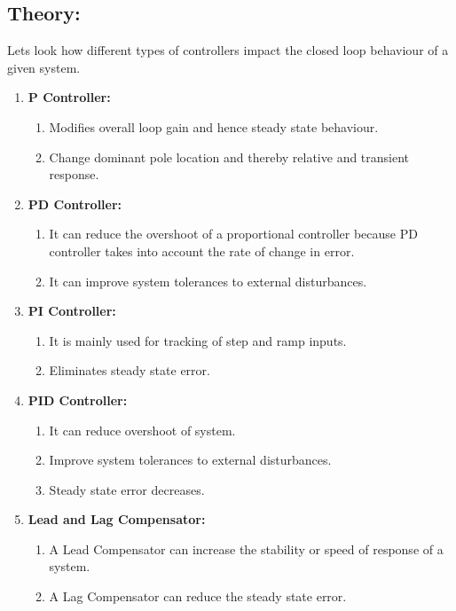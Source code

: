 \documentclass[12pt]{article}
\begin{document}
\subsection*{Theory:}
Lets look how different types of controllers impact the closed loop behaviour of a given system.
\begin{enumerate}[label={\alph*)}]
  \item \textbf{P Controller:}
  \begin{enumerate}[label={(\roman*)}]
    \item Modifies overall loop gain and hence steady state behaviour.
    
    \item Change dominant pole location and thereby relative and transient response.
  \end{enumerate}

  \item \textbf{PD Controller:}
  \begin{enumerate}[label={(\roman*)}]
    \item It can reduce the overshoot of a proportional controller because PD controller takes into account the rate of change in error.
    
    \item It can improve system tolerances to external disturbances.
  \end{enumerate}

  \item \textbf{PI Controller:}
  \begin{enumerate}[label={(\roman*)}]
    \item It is mainly used for tracking of step and ramp inputs.
    \item Eliminates steady state error.
  \end{enumerate}


  \item \textbf{PID Controller:}
  \begin{enumerate}[label={(\roman*)}]
    \item It can reduce overshoot of system.
    \item Improve system tolerances to external disturbances.
    \item Steady state error decreases.
  \end{enumerate}

  \item \textbf{Lead and Lag Compensator:}
  \begin{enumerate}[label={(\roman*)}]
    \item A Lead Compensator can increase the stability or speed of response of a system.
	  \item A Lag Compensator can reduce the steady state error.
  \end{enumerate}
\end{enumerate}
\end{document}
